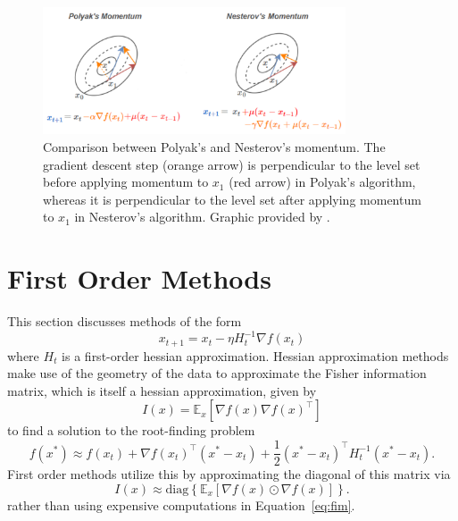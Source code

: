 \documentclass{article}
\theoremstyle{definition}
\begin{document}
\begin{figure}[t]
    \centering
    \includegraphics[width=0.8\textwidth]{sc1.png}
    \caption{Comparison between
    Polyak’s and Nesterov’s momentum. The gradient descent step (orange arrow)
    is perpendicular to the level set before applying momentum to $x_1$ (red
    arrow) in Polyak’s algorithm, whereas it is perpendicular to the level set
    after applying momentum to $x_1$ in Nesterov’s algorithm. Graphic provided by \citeauthor{nesterovnotes}.}
    \label{fig:sc1-png}
\end{figure}

\section{First Order Methods}

This section discusses methods of the form 
\begin{equation}
    x_{t + 1} = x_t - \eta H_t^{-1} \nabla f(x_t)
\end{equation}
where $H_t$ is a first-order hessian approximation.  Hessian approximation
methods make use of the geometry of the data to approximate the Fisher
information matrix, which is itself a hessian approximation, given by 
\begin{equation}
    \label{eq:fim}
    I(x) = \mathbb E_x \left[ \nabla f(x) \nabla {f(x)}^\intercal \right]
\end{equation}
to find a solution to the root-finding problem
\begin{equation}
    f(x^*) \approx f(x_t) + \nabla {f(x_t)}^\intercal (x^* - x_t) + \frac 1 2 {(x^* -
    x_t)}^\intercal H_t^{-1} (x^* - x_t).
\end{equation}
First order methods utilize this by approximating the diagonal of this matrix
via
\begin{equation}
    I(x) \approx \text{diag} \left\{ \mathbb E_x \left[ \nabla f(x) \odot \nabla
    {f(x)} \right] \right\}.
\end{equation}
rather than using expensive computations in Equation~\ref{eq:fim}.
\end{document}
